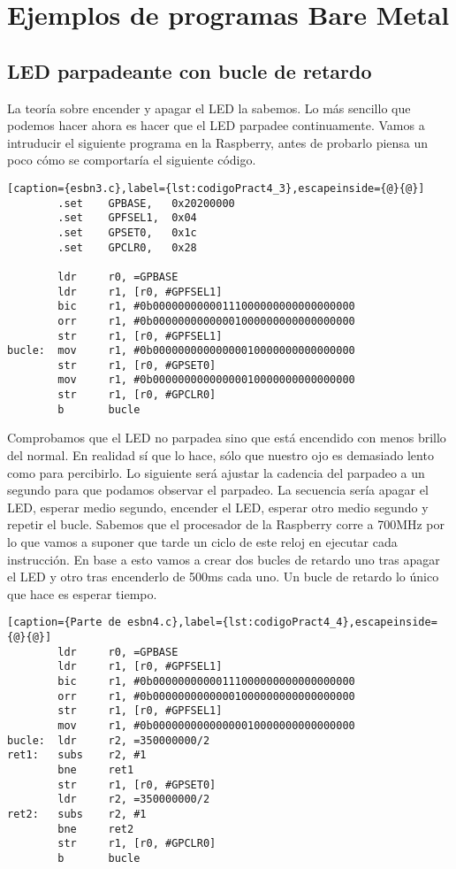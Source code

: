 \section{Ejemplos de programas Bare Metal}

\subsection{LED parpadeante con bucle de retardo}

La teoría sobre encender y apagar el LED la sabemos. Lo más sencillo que podemos hacer ahora
es hacer que el LED parpadee continuamente. Vamos a intruducir el siguiente programa en la
Raspberry, antes de probarlo piensa un poco cómo se comportaría el siguiente código.

\begin{lstlisting}[caption={esbn3.c},label={lst:codigoPract4_3},escapeinside={@}{@}]
        .set    GPBASE,   0x20200000
        .set    GPFSEL1,  0x04
        .set    GPSET0,   0x1c
        .set    GPCLR0,   0x28

        ldr     r0, =GPBASE
        ldr     r1, [r0, #GPFSEL1]
        bic     r1, #0b00000000000111000000000000000000
        orr     r1, #0b00000000000001000000000000000000
        str     r1, [r0, #GPFSEL1]
bucle:  mov     r1, #0b00000000000000010000000000000000
        str     r1, [r0, #GPSET0]
        mov     r1, #0b00000000000000010000000000000000
        str     r1, [r0, #GPCLR0]
        b       bucle
\end{lstlisting}

Comprobamos que el LED no parpadea sino que está encendido con menos brillo del normal.
En realidad sí que lo hace, sólo que nuestro ojo es demasiado lento como para percibirlo.
Lo siguiente será ajustar la cadencia del parpadeo a un segundo para que podamos observar
el parpadeo. La secuencia sería apagar el LED, esperar medio segundo, encender el LED,
esperar otro medio segundo y repetir el bucle. Sabemos que el procesador de la Raspberry
corre a 700MHz por lo que vamos a suponer que tarde un ciclo de este reloj en ejecutar
cada instrucción. En base a esto vamos a crear dos bucles de retardo uno tras apagar el LED
y otro tras encenderlo de 500ms cada uno. Un bucle de retardo lo único que hace es esperar
tiempo. 

\begin{lstlisting}[caption={Parte de esbn4.c},label={lst:codigoPract4_4},escapeinside={@}{@}]
        ldr     r0, =GPBASE
        ldr     r1, [r0, #GPFSEL1]
        bic     r1, #0b00000000000111000000000000000000
        orr     r1, #0b00000000000001000000000000000000
        str     r1, [r0, #GPFSEL1]
        mov     r1, #0b00000000000000010000000000000000
bucle:  ldr     r2, =350000000/2
ret1:   subs    r2, #1
        bne     ret1
        str     r1, [r0, #GPSET0]
        ldr     r2, =350000000/2
ret2:   subs    r2, #1
        bne     ret2
        str     r1, [r0, #GPCLR0]
        b       bucle
\end{lstlisting}

